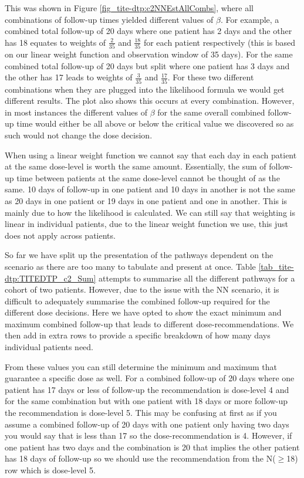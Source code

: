 This was shown in Figure \ref{fig_tite-dtp:c2NNEstAllCombs}, where all combinations of follow-up times yielded different values of $\beta$. For example, a combined total follow-up of 20 days where one patient has 2 days and the other has 18 equates to weights of $\frac{2}{35}$ and $\frac{18}{35}$ for each patient respectively (this is based on our linear weight function and observation window of 35 days). For the same combined total follow-up of 20 days but split where one patient has 3 days and the other has 17 leads to weights of $\frac{3}{35}$ and $\frac{17}{35}$. For these two different combinations when they are plugged into the likelihood formula we would get different results. The plot also shows this occurs at every combination. However, in most instances the different values of $\beta$ for the same overall combined follow-up time would either be all above or below the critical value we discovered so as such would not change the dose decision. 

When using a linear weight function we cannot say that each day in each patient at the same dose-level is worth the same amount. Essentially, the sum of follow-up time between patients at the same dose-level cannot be thought of as the same. 10 days of follow-up in one patient and 10 days in another is not the same as 20 days in one patient or 19 days in one patient and one in another. This is mainly due to how the likelihood is calculated. We can still say that weighting is linear in individual patients, due to the linear weight function we use, this just does not apply across patients. 
 
So far we have split up the presentation of the pathways dependent on the scenario as there are too many to tabulate and present at once. Table \ref{tab_tite-dtp:TITEDTP_c2_Sum} attempts to summarise all the different pathways for a cohort of two patients. However, due to the issue with the NN scenario, it is difficult to adequately summarise the combined follow-up required for the different dose decisions. Here we have opted to show the exact minimum and maximum combined follow-up that leads to different dose-recommendations. We then add in extra rows to provide a specific breakdown of how many days individual patients need.  

From these values you can still determine the minimum and maximum that guarantee a specific dose as well. For a combined follow-up of 20 days where one patient has 17 days or less of follow-up the recommendation is dose-level 4 and for the same combination but with one patient with 18 days or more follow-up the recommendation is dose-level 5. This may be confusing at first as if you assume a combined follow-up of 20 days with one patient only having two days you would say that is less than 17 so the dose-recommendation is 4. However, if one patient has two days and the combination is 20 that implies the other patient has 18 days of follow-up so we should use the recommendation from the N($\geq$18) row which is dose-level 5.

